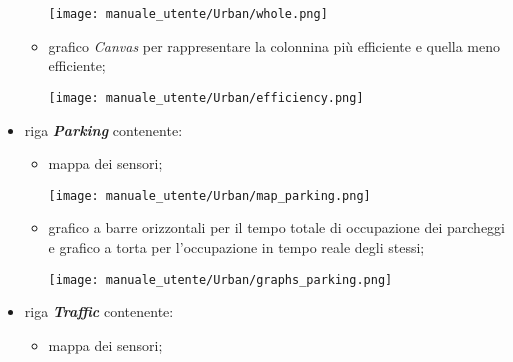\begin{itemize}
\begin{itemize}
        \begin{center}
            \texttt{[image: manuale\_utente/Urban/whole.png]}
        \end{center}
        \item grafico \textit{Canvas} per rappresentare la colonnina più efficiente e quella meno efficiente;
        \begin{center}
            \texttt{[image: manuale\_utente/Urban/efficiency.png]}
        \end{center}
    \end{itemize}
    \item riga \textit{\textbf{Parking}} contenente:
    \begin{itemize}
        \item mappa dei sensori;
        \begin{center}
            \texttt{[image: manuale\_utente/Urban/map\_parking.png]}
        \end{center}
        \item grafico a barre orizzontali per il tempo totale di occupazione dei parcheggi e grafico a torta per l'occupazione in tempo reale degli stessi;
        \begin{center}
            \texttt{[image: manuale\_utente/Urban/graphs\_parking.png]}
        \end{center}
    \end{itemize}
    \item riga \textit{\textbf{Traffic}} contenente:
    \begin{itemize}
        \item mappa dei sensori;
        \begin{center}

\end{center}
\end{itemize}
\end{itemize}
